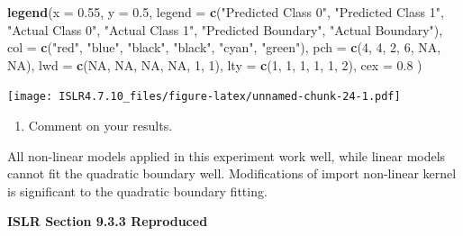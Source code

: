 \documentclass[
]{article}
\newenvironment{Shaded}{\begin{snugshade}}{\end{snugshade}}
\newcommand{\AttributeTok}[1]{\textcolor[rgb]{0.13,0.29,0.53}{#1}}
\newcommand{\ConstantTok}[1]{\textcolor[rgb]{0.56,0.35,0.01}{#1}}
\newcommand{\DecValTok}[1]{\textcolor[rgb]{0.00,0.00,0.81}{#1}}
\newcommand{\FloatTok}[1]{\textcolor[rgb]{0.00,0.00,0.81}{#1}}
\newcommand{\FunctionTok}[1]{\textcolor[rgb]{0.13,0.29,0.53}{\textbf{#1}}}
\newcommand{\NormalTok}[1]{#1}
\newcommand{\StringTok}[1]{\textcolor[rgb]{0.31,0.60,0.02}{#1}}
\providecommand{\tightlist}{%
  \setlength{\itemsep}{0pt}\setlength{\parskip}{0pt}}
\begin{document}
\begin{Shaded}
\begin{Highlighting}[]
\FunctionTok{legend}\NormalTok{(}\AttributeTok{x =} \FloatTok{0.55}\NormalTok{, }\AttributeTok{y =} \FloatTok{0.5}\NormalTok{, }
       \AttributeTok{legend =} \FunctionTok{c}\NormalTok{(}\StringTok{"Predicted Class 0"}\NormalTok{, }\StringTok{"Predicted Class 1"}\NormalTok{, }
                  \StringTok{"Actual Class 0"}\NormalTok{, }\StringTok{"Actual Class 1"}\NormalTok{, }\StringTok{"Predicted Boundary"}\NormalTok{, }\StringTok{"Actual Boundary"}\NormalTok{), }
       \AttributeTok{col =} \FunctionTok{c}\NormalTok{(}\StringTok{"red"}\NormalTok{, }\StringTok{"blue"}\NormalTok{, }\StringTok{"black"}\NormalTok{, }\StringTok{"black"}\NormalTok{, }\StringTok{"cyan"}\NormalTok{, }\StringTok{"green"}\NormalTok{), }
       \AttributeTok{pch =} \FunctionTok{c}\NormalTok{(}\DecValTok{4}\NormalTok{, }\DecValTok{4}\NormalTok{, }\DecValTok{2}\NormalTok{, }\DecValTok{6}\NormalTok{, }\ConstantTok{NA}\NormalTok{, }\ConstantTok{NA}\NormalTok{),}
       \AttributeTok{lwd =} \FunctionTok{c}\NormalTok{(}\ConstantTok{NA}\NormalTok{, }\ConstantTok{NA}\NormalTok{, }\ConstantTok{NA}\NormalTok{, }\ConstantTok{NA}\NormalTok{, }\DecValTok{1}\NormalTok{, }\DecValTok{1}\NormalTok{),}
       \AttributeTok{lty =} \FunctionTok{c}\NormalTok{(}\DecValTok{1}\NormalTok{, }\DecValTok{1}\NormalTok{, }\DecValTok{1}\NormalTok{, }\DecValTok{1}\NormalTok{, }\DecValTok{1}\NormalTok{, }\DecValTok{2}\NormalTok{),}
       \AttributeTok{cex =} \FloatTok{0.8}
\NormalTok{       )}
\end{Highlighting}
\end{Shaded}

\texttt{[image: ISLR4.7.10\_files/figure-latex/unnamed-chunk-24-1.pdf]}

\begin{enumerate}
\def\labelenumi{(\roman{enumi})}
\tightlist
\item
  Comment on your results.
\end{enumerate}

All non-linear models applied in this experiment work well, while linear
models cannot fit the quadratic boundary well. Modifications of import
non-linear kernel is significant to the quadratic boundary fitting.

\textbf{ISLR Section 9.3.3 Reproduced}
\end{document}
